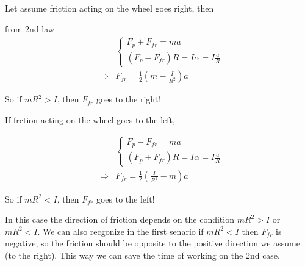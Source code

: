\documentclass{article}
\begin{document}
\begin{multicols}{2}%

Let assume friction acting on the wheel goes right, then



from 2nd law%
\begin{eqnarray*}
&&\left\{ 
\begin{array}{c}
F_{p}+F_{fr}=ma \\ 
\left( F_{p}-F_{fr}\right) R=I\alpha =I\frac{a}{R}%
\end{array}%
\right. \\
&\Rightarrow &F_{fr}=\frac{1}{2}\left( m-\frac{I}{R^{2}}\right) a
\end{eqnarray*}

So if $mR^{2}>I$, then $F_{fr}$ goes to the right!

\bigskip

If frction acting on the wheel goes to the left,



\begin{eqnarray*}
&&\left\{ 
\begin{array}{c}
F_{p}-F_{fr}=ma \\ 
\left( F_{p}+F_{fr}\right) R=I\alpha =I\frac{a}{R}%
\end{array}%
\right. \\
&\Rightarrow &F_{fr}=\frac{1}{2}\left( \frac{I}{R^{2}}-m\right) a
\end{eqnarray*}

So if $mR^{2}<I$, then $F_{fr}$ goes to the left!

\bigskip

\end{multicols}%

\bigskip

In this case the direction of friction depends on the condition $mR^{2}>I$
or $mR^{2}<I$. We can also recgonize in the first senario if $mR^{2}<I$ then 
$F_{fr}$ is negative, so the friction should be opposite to the positive
direction we assume (to the right). This way we can save the time of working
on the 2nd case.
\end{document}
